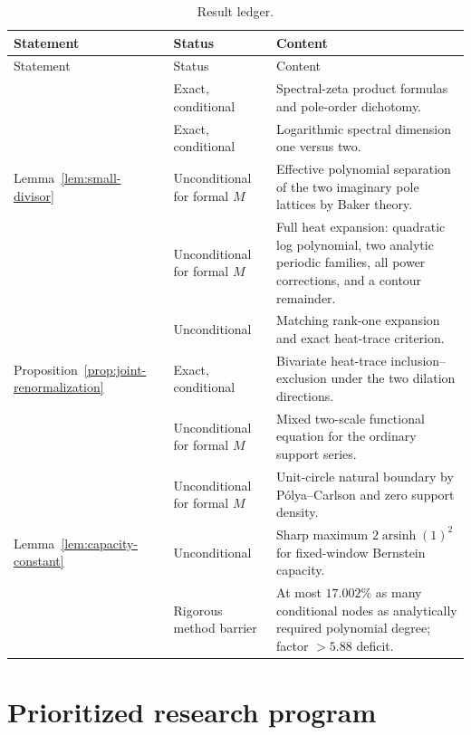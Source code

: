 \documentclass[11pt,oneside]{article}
\theoremstyle{definition}
\theoremstyle{remark}
\newcommand{\asinh}{\operatorname{arsinh}}
\begin{document}
\begin{longtable}{L{0.26\textwidth}L{0.16\textwidth}L{0.50\textwidth}}
\caption{Result ledger.}\label{tab:ledger}\\
\toprule
Statement & Status & Content \\
\midrule
\endfirsthead
\toprule
Statement & Status & Content \\
\midrule
\endhead
{}
& Exact, conditional
& Spectral-zeta product formulas and pole-order dichotomy. \\
\addlinespace
{}
& Exact, conditional
& Logarithmic spectral dimension one versus two. \\
\addlinespace
Lemma~\ref{lem:small-divisor}
& Unconditional for formal $M$
& Effective polynomial separation of the two imaginary pole lattices by Baker theory. \\
\addlinespace
{}
& Unconditional for formal $M$
& Full heat expansion: quadratic log polynomial, two analytic periodic families, all power corrections, and a contour remainder. \\
\addlinespace
{}
& Unconditional
& Matching rank-one expansion and exact heat-trace criterion. \\
\addlinespace
Proposition~\ref{prop:joint-renormalization}
& Exact, conditional
& Bivariate heat-trace inclusion--exclusion under the two dilation directions. \\
\addlinespace
{}
& Unconditional for formal $M$
& Mixed two-scale functional equation for the ordinary support series. \\
\addlinespace
{}
& Unconditional for formal $M$
& Unit-circle natural boundary by P\'olya--Carlson and zero support density. \\
\addlinespace
Lemma~\ref{lem:capacity-constant}
& Unconditional
& Sharp maximum $2\asinh(1)^2$ for fixed-window Bernstein capacity. \\
\addlinespace
{}
& Rigorous method barrier
& At most $17.002\%$ as many conditional nodes as analytically required polynomial degree; factor $>5.88$ deficit. \\
\bottomrule
\end{longtable}

\section{Prioritized research program}
\label{sec:program}
\end{document}
